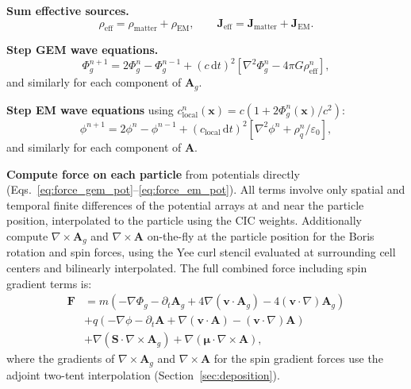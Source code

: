 \documentclass[11pt,a4paper]{article}
\newcommand{\vv}[1]{\mathbf{#1}}
\newcommand{\Phig}{\Phi_g}
\newcommand{\Ag}{\vv{A}_g}
\newcommand{\dd}{\mathrm{d}}
\begin{document}
\begin{algsteps}
  \item \textbf{Sum effective sources.}
  \begin{equation}
    \rho_{\mathrm{eff}} = \rho_{\mathrm{matter}} + \rho_{\mathrm{EM}}, \qquad
    \vv{J}_{\mathrm{eff}} = \vv{J}_{\mathrm{matter}} + \vv{J}_{\mathrm{EM}}.
  \end{equation}

  \item \textbf{Step GEM wave equations.}
  \begin{equation}
    \Phig^{n+1} = 2\Phig^n - \Phig^{n-1} + (c\,\dd t)^2\!\left[\nabla^2\Phig^n - 4\pi G\rho_{\mathrm{eff}}^n\right],
  \end{equation}
  and similarly for each component of $\Ag$.

  \item \textbf{Step EM wave equations} using $c_{\mathrm{local}}^n(\vv{x}) = c(1+2\Phig^n(\vv{x})/c^2)$:
  \begin{equation}
    \phi^{n+1} = 2\phi^n - \phi^{n-1} + (c_{\mathrm{local}}\,\dd t)^2\!\left[\nabla^2\phi^n + \rho_q^n/\varepsilon_0\right],
  \end{equation}
  and similarly for each component of $\vv{A}$.

  \item \textbf{Compute force on each particle} from potentials directly (Eqs.~\ref{eq:force_gem_pot}--\ref{eq:force_em_pot}).  All terms involve only spatial and temporal finite differences of the potential arrays at and near the particle position, interpolated to the particle using the CIC weights.  Additionally compute $\nabla\times\Ag$ and $\nabla\times\vv{A}$ on-the-fly at the particle position for the Boris rotation and spin forces, using the Yee curl stencil evaluated at surrounding cell centers and bilinearly interpolated.  The full combined force including spin gradient terms is:
  \begin{align}
    \vv{F} &= m\!\left(-\nabla\Phig - \partial_t\Ag + 4\nabla(\vv{v}\cdot\Ag) - 4(\vv{v}\cdot\nabla)\Ag\right) \nonumber \\
           &+ q\!\left(-\nabla\phi - \partial_t\vv{A} + \nabla(\vv{v}\cdot\vv{A}) - (\vv{v}\cdot\nabla)\vv{A}\right) \nonumber \\
           &+ \nabla(\vv{S}\cdot\nabla\times\Ag) + \nabla(\boldsymbol{\mu}\cdot\nabla\times\vv{A}),
  \end{align}
  where the gradients of $\nabla\times\Ag$ and $\nabla\times\vv{A}$ for the spin gradient forces use the adjoint two-tent interpolation (Section~\ref{sec:deposition}).


\end{algsteps}
\end{document}
